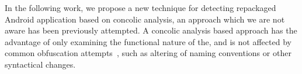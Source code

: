 \documentclass{sig-alternate}
\begin{document}
In the following work, we propose a new technique for detecting repackaged Android application based on concolic analysis, an approach which we are not aware has been previously attempted. A concolic analysis based approach has the advantage of only examining the functional nature of the, and is not affected by common obfuscation attempts~\cite{krutz2013cccd}, such as altering of naming conventions or other syntactical changes.







\end{document}
